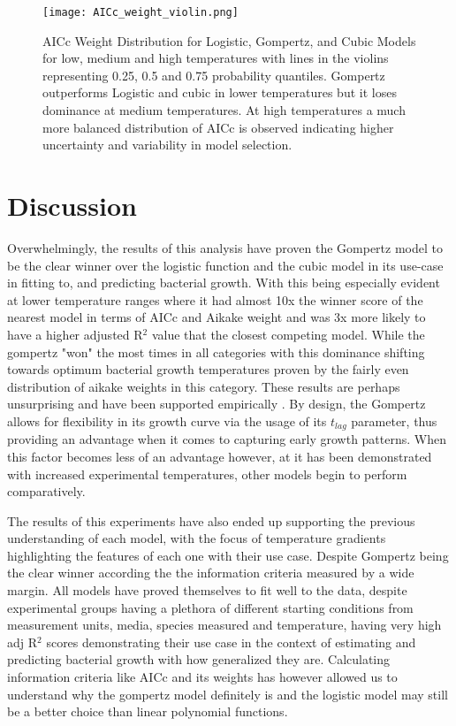 \documentclass[11pt]{article}
\begin{document}
\begin{figure}[htbp]
    \centering
    \texttt{[image: AICc\_weight\_violin.png]}
    \caption{AICc Weight Distribution for Logistic, Gompertz, and Cubic Models for low, medium and high temperatures with lines in the violins representing 0.25, 0.5 and 0.75 probability quantiles. Gompertz outperforms Logistic and cubic in lower temperatures but it loses dominance at medium temperatures. At high temperatures a much more balanced distribution of AICc is observed indicating higher uncertainty and variability in model selection.}
    \label{fig:aic_weight_distribution}
\end{figure}


\FloatBarrier %

\section{Discussion}
Overwhelmingly, the results of this analysis have proven the Gompertz model to be the clear winner over the logistic function and the cubic model in its use-case in fitting to, and predicting bacterial growth. With this being especially evident at lower temperature ranges where it had almost 10x the winner score of the nearest model in terms of AICc and Aikake weight and was 3x more likely to have a higher adjusted R$^2$ value that the closest competing model. While the gompertz "won" the most times in all categories with this dominance shifting towards optimum bacterial growth temperatures proven by the fairly even distribution of aikake weights in this category. These results are perhaps unsurprising and have been supported empirically \cite{buchanan1997simple,Peleg01122011,zwietering1990modeling}. By design, the Gompertz allows for flexibility in its growth curve via the usage of its $t_{lag}$ parameter, thus providing an advantage when it comes to capturing early growth patterns. When this factor becomes less of an advantage however, at it has been demonstrated with increased experimental temperatures, other models begin to perform comparatively.  

The results of this experiments have also ended up supporting the previous understanding of each model, with the focus of temperature gradients highlighting the features of each one with their use case. Despite Gompertz being the clear winner according the the information criteria measured by a wide margin. All models have proved themselves to fit well to the data, despite experimental groups having a plethora of different starting conditions from measurement units, media, species measured and temperature, having very high adj R$^2$ scores demonstrating their use case in the context of estimating and predicting bacterial growth with how generalized they are. Calculating information criteria like AICc and its weights has however allowed us to understand why the gompertz model definitely is and the logistic model may still be a better choice than linear polynomial functions.
\end{document}
